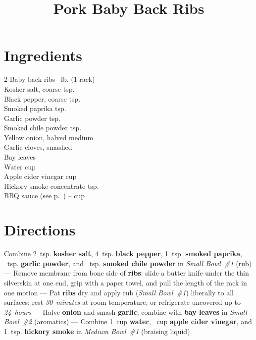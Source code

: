 \documentclass[11pt,letterpaper]{article}
\title{Pork Baby Back Ribs}
\author{}
\date{}
\begin{document}
\maketitle
\thispagestyle{empty}

\section*{Ingredients}
\setlength{\columnsep}{20pt}
\begin{multicols}{2}
\noindent
    Baby back ribs ~lb. (1 rack) \\
    Kosher salt, coarse  tsp. \\
    Black pepper, coarse  tsp. \\
    Smoked paprika  tsp. \\
    Garlic powder \dotfill {} tsp. \\
    Smoked chile powder \dotfill {} tsp. \\
    \columnbreak
    Yellow onion, halved  medium \\
    Garlic cloves, smashed  \\
    Bay leaves  \\
    Water  cup \\
    Apple cider vinegar \dotfill {} cup \\
    Hickory smoke concentrate  tsp. \\
    BBQ sauce (see p.~\pageref{sec:sauce}) \dotfill {}-- cup \\
\end{multicols}

\section*{Directions}

\noindent
Combine 2~tsp. \textbf{kosher salt}, 4~tsp. \textbf{black pepper}, 1~tsp. \textbf{smoked paprika}, ~tsp. \textbf{garlic powder}, and ~tsp. \textbf{smoked chile powder} in \textit{Small Bowl~\#1} (rub) ---
Remove membrane from bone side of \textbf{ribs}: slide a butter knife under the thin silverskin at one end, grip with a paper towel, and pull the length of the rack in one motion ---
Pat \textbf{ribs} dry and apply rub (\textit{Small Bowl~\#1}) liberally to all surfaces; rest \textit{30~minutes} at room temperature, or refrigerate uncovered up to \textit{24~hours} ---
Halve \textbf{onion} and smash \textbf{garlic}; combine with \textbf{bay leaves} in \textit{Small Bowl~\#2} (aromatics) ---
Combine 1~cup \textbf{water}, ~cup \textbf{apple cider vinegar}, and 1~tsp. \textbf{hickory smoke} in \textit{Medium Bowl~\#1} (braising liquid)
\end{document}
